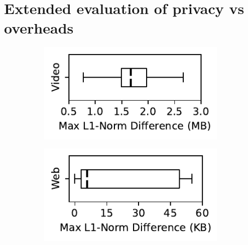 \section{Extended evaluation of privacy vs overheads}
\label{sec:eval-extended}

\begin{figure}[t]
    \centering
    \begin{subfigure}{0.49\columnwidth}
      \includegraphics[width=\textwidth]{neighboring_distances_barplot_video.pdf}
    \end{subfigure}
    \hfill
    \begin{subfigure}{0.49\columnwidth}
      \includegraphics[width=\textwidth]{neighboring_distances_barplot_web.pdf}
    \end{subfigure}
    \caption{
    }
    \vspace{-0.2cm}
    \label{fig:sensitivity-comparison}
\end{figure}

